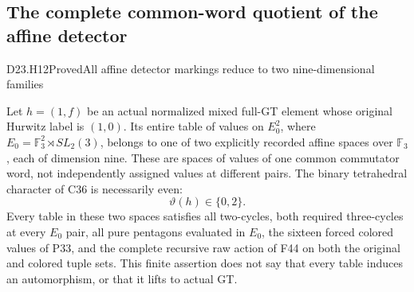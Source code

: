 \subsection{The complete common-word quotient of the affine detector}

\begin{statement}{D23.H12}{Proved}{All affine detector markings reduce to two nine-dimensional families}
\end{statement}
Let $h=(1,f)$ be an actual normalized mixed full-GT element
whose original Hurwitz label is $(1,0)$. Its entire table of
values on $E_0^2$, where $E_0=\mathbb F_3^2\rtimes SL_2(3)$,
belongs to one of two explicitly recorded affine spaces over
$\mathbb F_3$, each of dimension nine. These are spaces of
values of one common commutator word, not independently
assigned values at different pairs. The binary tetrahedral
character of C36 is necessarily even:
\[
                          \vartheta(h)\in\{0,2\}.
                                                        \tag{D23.H12.1}
\]
Every table in these two spaces satisfies all two-cycles,
both required three-cycles at every $E_0$ pair, all pure
pentagons evaluated in $E_0$, the sixteen forced colored
values of P33, and the complete recursive raw action of
F44 on both the original and colored tuple sets. This
finite assertion does not say that every table induces an
automorphism, or that it lifts to actual GT.

